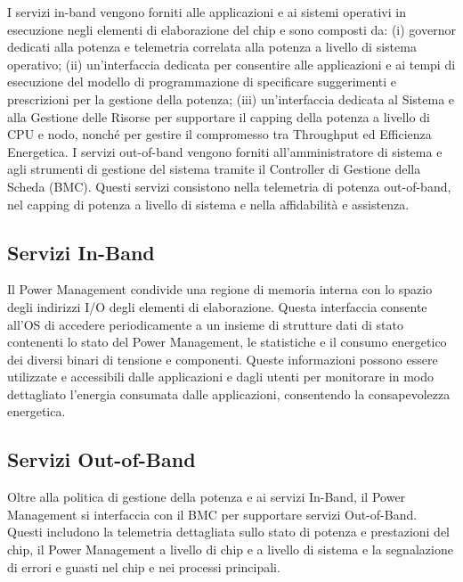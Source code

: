 I servizi in-band vengono forniti alle applicazioni e ai sistemi operativi in esecuzione negli elementi di elaborazione del chip e sono composti da: (i) governor dedicati alla potenza e telemetria correlata alla potenza a livello di sistema operativo; (ii) un'interfaccia dedicata per consentire alle applicazioni e ai tempi di esecuzione del modello di programmazione di specificare suggerimenti e prescrizioni per la gestione della potenza; (iii) un'interfaccia dedicata al Sistema e alla Gestione delle Risorse per supportare il capping della potenza a livello di CPU e nodo, nonché per gestire il compromesso tra Throughput ed Efficienza Energetica. I servizi out-of-band vengono forniti all'amministratore di sistema e agli strumenti di gestione del sistema tramite il Controller di Gestione della Scheda (BMC). Questi servizi consistono nella telemetria di potenza out-of-band, nel capping di potenza a livello di sistema e nella affidabilità e assistenza.

\subsection{Servizi In-Band}
Il Power Management condivide una regione di memoria interna con lo spazio degli indirizzi I/O degli elementi di elaborazione. Questa interfaccia consente all'OS di accedere periodicamente a un insieme di strutture dati di stato contenenti lo stato del Power Management, le statistiche e il consumo energetico dei diversi binari di tensione e componenti. Queste informazioni possono essere utilizzate e accessibili dalle applicazioni e dagli utenti per monitorare in modo dettagliato l'energia consumata dalle applicazioni, consentendo la consapevolezza energetica.

\subsection{Servizi Out-of-Band}
Oltre alla politica di gestione della potenza e ai servizi In-Band, il Power Management si interfaccia con il BMC per supportare servizi Out-of-Band. Questi includono la telemetria dettagliata sullo stato di potenza e prestazioni del chip, il Power Management a livello di chip e a livello di sistema e la segnalazione di errori e guasti nel chip e nei processi principali.

